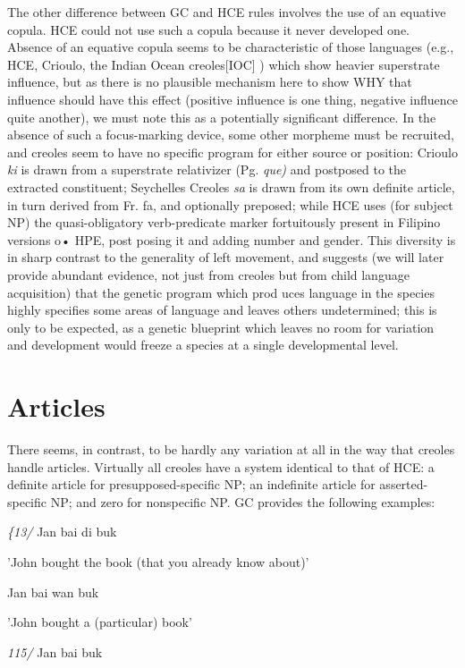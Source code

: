 The other difference between GC and HCE rules involves the use of an equative copula. HCE could not use such a copula because it never developed one. Absence of an equative copula seems to be
characteristic of those languages (e.g., HCE, Crioulo, the Indian Ocean creoles[IOC] ) which show heavier superstrate influence, but as there is no plausible mechanism here to show WHY that influence should have this effect (positive influence is one thing, negative influence quite
another), we must note this as a potentially significant difference. In the absence of such a focus-marking device, some other morpheme must be recruited, and creoles seem to have no specific program for either source or position: Crioulo \textit{ki} is drawn from a superstrate rela\-tivizer (Pg. \textit{que}\textit{)} and postposed to the extracted constituent; Seychelles Creoles \textit{sa} is drawn from its own definite article, in turn derived from Fr. fa, and optionally preposed; while HCE uses (for subject NP) the quasi-obligatory verb-predicate marker fortuitously present in Filipino versions o• HPE, post posing it and adding number and gender. This diversity is in sharp contrast to the generality of left movement, and suggests (we will later provide abundant evidence, not just from creoles but from child language acquisition) that the genetic program which prod uces language in the species highly specifies some areas of language and leaves others undetermined; this is only to be expected, as a genetic blueprint which leaves no room for variation and development would freeze a species at a single developmental level.

\section{Articles}
There seems, in contrast, to be hardly any variation at all in the way that creoles handle articles. Virtually all creoles have a system iden\-tical to that of HCE: a definite article for presupposed-specific NP; an indefinite article for asserted-specific NP; and zero for nonspecific NP. GC provides the following examples:

\textit{\{13}\textit{/} Jan bai di buk

'John bought the book (that you already know about)'

\ea\label{ex:14}
 Jan bai wan buk
\glt
\z

'John bought a (particular) book'

\textit{115/ }Jan bai buk

